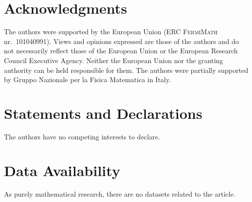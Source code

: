 \documentclass[12pt,a4paper]{article}
\numberwithin{equation}{section}
\newcommand{\1}{\mathbb{I}}
\theoremstyle{plain}
\theoremstyle{definition}
\theoremstyle{remark}
\theoremstyle{plain}
\theoremstyle{definition}
\theoremstyle{remark}
\begin{document}
\section*{Acknowledgments}
The authors were supported by the European Union (ERC \textsc{FermiMath} nr.~101040991). Views and opinions expressed are those of the authors and do not necessarily reflect those of the European Union or the European Research Council Executive Agency. Neither the European Union nor the granting authority can be held responsible for them. The authors were partially supported by Gruppo Nazionale per la Fisica Matematica in Italy.

\section*{Statements and Declarations}
The authors have no competing interests to declare.

\section*{Data Availability}
As purely mathematical research, there are no datasets related to the article.
\end{document}
